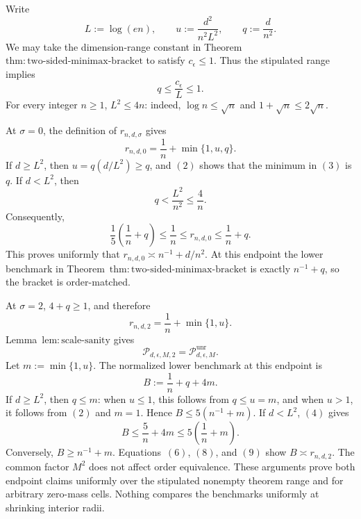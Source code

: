 Write
\[
 L:=\log(en),\qquad
 u:=\frac{d^2}{n^2L^2},\qquad
 q:=\frac d{n^2}.
\tag{1}
\]
We may take the dimension-range constant in Theorem~\(\mathrm{thm:two\text{-}sided\text{-}minimax\text{-}bracket}\) to satisfy \(c_{\epsilon}\le1\).  Thus the stipulated range implies
\[
 q\le\frac{c_{\epsilon}}L\le1.
\tag{2}
\]
For every integer \(n\ge1\), \(L^2\le4n\): indeed, \(\log n\le\sqrt n\) and \(1+\sqrt n\le2\sqrt n\).

At \(\sigma=0\), the definition of \(r_{n,d,\sigma}\) gives
\[
 r_{n,d,0}=\frac1n+\min\{1,u,q\}.
\tag{3}
\]
If \(d\ge L^2\), then \(u=q(d/L^2)\ge q\), and \((2)\) shows that the minimum in \((3)\) is \(q\).  If \(d<L^2\), then
\[
 q<\frac{L^2}{n^2}\le\frac4n.
\tag{4}
\]
Consequently,
\[
 \frac15\left(\frac1n+q\right)
 \le \frac1n\le r_{n,d,0}\le\frac1n+q.
\tag{5}
\]
This proves uniformly that \(r_{n,d,0}\asymp n^{-1}+d/n^2\).  At this endpoint the lower benchmark in Theorem~\(\mathrm{thm:two\text{-}sided\text{-}minimax\text{-}bracket}\) is exactly \(n^{-1}+q\), so the bracket is order-matched.

At \(\sigma=2\), \(4+q\ge1\), and therefore
\[
 r_{n,d,2}=\frac1n+\min\{1,u\}.
\tag{6}
\]
Lemma~\(\mathrm{lem:scale\text{-}sanity}\) gives
\[
 \mathcal P_{d,\epsilon,M,2}=\mathcal P_{d,\epsilon,M}^{\mathrm{unr}}.
\tag{7}
\]
Let \(m:=\min\{1,u\}\).  The normalized lower benchmark at this endpoint is
\[
 B:=\frac1n+q+4m.
\tag{8}
\]
If \(d\ge L^2\), then \(q\le m\): when \(u\le1\), this follows from \(q\le u=m\), and when \(u>1\), it follows from \((2)\) and \(m=1\).  Hence \(B\le5(n^{-1}+m)\).  If \(d<L^2\), \((4)\) gives
\[
 B\le\frac5n+4m\le5\left(\frac1n+m\right).
\tag{9}
\]
Conversely, \(B\ge n^{-1}+m\).  Equations~\((6)\), \((8)\), and \((9)\) show \(B\asymp r_{n,d,2}\).  The common factor \(M^2\) does not affect order equivalence.  These arguments prove both endpoint claims uniformly over the stipulated nonempty theorem range and for arbitrary zero-mass cells.  Nothing compares the benchmarks uniformly at shrinking interior radii.